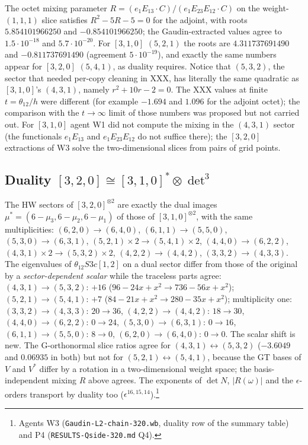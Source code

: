 \documentclass[11pt]{article}
\begin{document}
The octet mixing parameter $R=(e_1E_{13}\cdot C)/(e_1E_{23}E_{12}\cdot C)$ on the weight-$(1,1,1)$ slice satisfies $R^2-5R-5=0$ for the adjoint, with roots $5.854101966250$ and $-0.854101966250$; the Gaudin-extracted values agree to $1.5\cdot10^{-18}$ and $5.7\cdot10^{-20}$. For $[3,1,0]$ $(5,2,1)$ the roots are $4.311737691490$ and $-0.811737691490$ (agreement $5\cdot10^{-19}$), and exactly the same numbers appear for $[3,2,0]$ $(5,4,1)$, as duality requires.
Notice that $(5,3,2)$, the sector that needed per-copy cleaning in XXX, has literally the same quadratic as $[3,1,0]$'s $(4,3,1)$, namely $r^2+10r-2=0$. The XXX values at finite $t=\theta_{12}/h$ were different (for example $-1.694$ and $1.096$ for the adjoint octet); the comparison with the $t\to\infty$ limit of those numbers was proposed but not carried out.
For $[3,1,0]$ agent W1 did not compute the mixing in the $(4,3,1)$ sector (the functionals $e_1E_{13}$ and $e_1E_{23}E_{12}$ do not suffice there); the $[3,2,0]$ extractions of W3 solve the two-dimensional slices from pairs of grid points.

\subsection{Duality \texorpdfstring{$[3,2,0]\cong[3,1,0]^*\otimes\det^3$}{[3,2,0][3,1,0]*det}}\label{sec:duality}

The HW sectors of $[3,2,0]^{\otimes2}$ are exactly the dual images $\mu^*=(6-\mu_3,6-\mu_2,6-\mu_1)$ of those of $[3,1,0]^{\otimes2}$, with the same multiplicities: $(6,2,0)\to(6,4,0)$, $(6,1,1)\to(5,5,0)$, $(5,3,0)\to(6,3,1)$, $(5,2,1)\times2\to(5,4,1)\times2$, $(4,4,0)\to(6,2,2)$, $(4,3,1)\times2\to(5,3,2)\times2$, $(4,2,2)\to(4,4,2)$, $(3,3,2)\to(4,3,3)$. The eigenvalues of $\theta_{12}S3c[1,2]$ on a dual sector differ from those of the original by a \emph{sector-dependent scalar} while the traceless parts agree: $(4,3,1)\to(5,3,2)$: $+16$ ($96-24x+x^2\to736-56x+x^2$); $(5,2,1)\to(5,4,1)$: $+7$ ($84-21x+x^2\to280-35x+x^2$); multiplicity one: $(3,3,2)\to(4,3,3)$: $20\to36$, $(4,2,2)\to(4,4,2)$: $18\to30$, $(4,4,0)\to(6,2,2)$: $0\to24$, $(5,3,0)\to(6,3,1)$: $0\to16$, $(6,1,1)\to(5,5,0)$: $8\to0$, $(6,2,0)\to(6,4,0)$: $0\to0$. The scalar shift is new.
The G-orthonormal slice ratios agree for $(4,3,1)\leftrightarrow(5,3,2)$ ($-3.6049$ and $0.06935$ in both) but not for $(5,2,1)\leftrightarrow(5,4,1)$, because the GT bases of $V$ and $V^*$ differ by a rotation in a two-dimensional weight space; the basis-independent mixing $R$ above agrees.
The exponents of $\det N$, $|R(\omega)|$ and the $\epsilon$-orders transport by duality too ($\epsilon^{16,15,14}$).\footnote{Agents W3 (\texttt{Gaudin-\allowbreak{}L2-\allowbreak{}chain-\allowbreak{}320.\allowbreak{}wb}, duality row of the summary table) and P4 (\texttt{RESULTS-\allowbreak{}Qside-\allowbreak{}320.\allowbreak{}md} Q4).}
\end{document}
